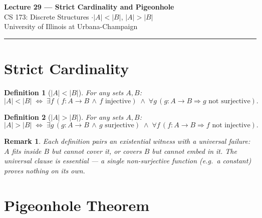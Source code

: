 \documentclass[11pt]{article}
\theoremstyle{defstyle}
\newtheorem{definition}{Definition}[section]
\theoremstyle{thmstyle}
\theoremstyle{notstyle}
\newtheorem*{remark}{Remark}
\theoremstyle{cautionstyle}
\newcommand{\card}[1]{\lvert #1 \rvert}
\begin{document}
\begin{center}
  {\Large\bfseries Lecture 29 --- Strict Cardinality and Pigeonhole}\\[4pt]
  {\normalsize CS 173: Discrete Structures \quad$\cdot$\quad $\card{A} < \card{B}$, $\card{A} > \card{B}$}\\[2pt]
  {\small\color{gray} University of Illinois at Urbana-Champaign}
\end{center}
\vspace{1em}\hrule\vspace{1.5em}

\section{Strict Cardinality}

\begin{defbox}
\begin{definition}[$\card{A} < \card{B}$]
For any sets $A, B$:
\[
  \card{A} < \card{B}
  \;\iff\;
  \exists f\,(f : A \to B \,\wedge\, f \text{ injective})
  \;\wedge\;
  \forall g\,(g : A \to B \Rightarrow g \text{ not surjective}).
\]
\end{definition}
\end{defbox}

\begin{defbox}
\begin{definition}[$\card{A} > \card{B}$]
For any sets $A, B$:
\[
  \card{A} > \card{B}
  \;\iff\;
  \exists g\,(g : A \to B \,\wedge\, g \text{ surjective})
  \;\wedge\;
  \forall f\,(f : A \to B \Rightarrow f \text{ not injective}).
\]
\end{definition}
\end{defbox}

\begin{notebox}
\begin{remark}
Each definition pairs an existential witness with a universal failure: $A$ fits
inside $B$ but cannot cover it, or covers $B$ but cannot embed in it. The
universal clause is essential --- a single non-surjective function (e.g.\ a
constant) proves nothing on its own.
\end{remark}
\end{notebox}

\section{Pigeonhole Theorem}
\end{document}
